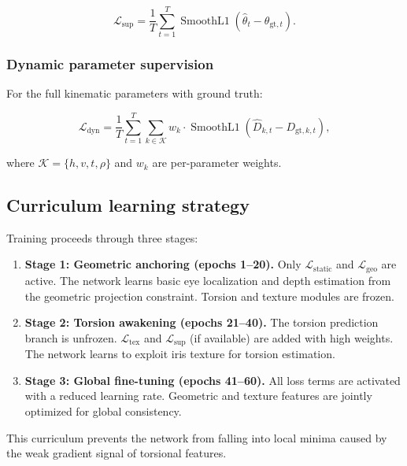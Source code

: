 \documentclass[review]{elsarticle}
\begin{document}
\begin{equation}
\mathcal{L}_{\text{sup}} = \frac{1}{T}\sum_{t=1}^{T}\operatorname{SmoothL1}(\hat{\theta}_t - \theta_{\text{gt},t}).
\label{eq:sup_loss}
\end{equation}

\subsubsection{Dynamic parameter supervision}

For the full kinematic parameters with ground truth:

\begin{equation}
\mathcal{L}_{\text{dyn}} = \frac{1}{T}\sum_{t=1}^{T}\sum_{k\in\mathcal{K}} w_k \cdot \operatorname{SmoothL1}(\hat{D}_{k,t} - D_{\text{gt},k,t}),
\label{eq:dyn_loss}
\end{equation}

where $\mathcal{K} = \{h, v, t, \rho\}$ and $w_k$ are per-parameter weights.

\subsection{Curriculum learning strategy}

Training proceeds through three stages:

\begin{enumerate}
    \item \textbf{Stage 1: Geometric anchoring (epochs 1--20).} Only $\mathcal{L}_{\text{static}}$ and $\mathcal{L}_{\text{geo}}$ are active. The network learns basic eye localization and depth estimation from the geometric projection constraint. Torsion and texture modules are frozen.
    \item \textbf{Stage 2: Torsion awakening (epochs 21--40).} The torsion prediction branch is unfrozen. $\mathcal{L}_{\text{tex}}$ and $\mathcal{L}_{\text{sup}}$ (if available) are added with high weights. The network learns to exploit iris texture for torsion estimation.
    \item \textbf{Stage 3: Global fine-tuning (epochs 41--60).} All loss terms are activated with a reduced learning rate. Geometric and texture features are jointly optimized for global consistency.
\end{enumerate}

This curriculum prevents the network from falling into local minima caused by the weak gradient signal of torsional features.
\end{document}
